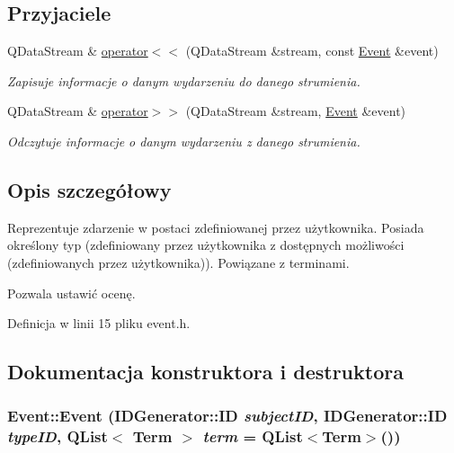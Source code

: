 \subsection*{Przyjaciele}
\begin{DoxyCompactItemize}
\item 
QDataStream \& \hyperlink{classEvent_a62e8730ab4dc16e3d456b527a12635b3}{operator$<$$<$} (QDataStream \&stream, const \hyperlink{classEvent}{Event} \&event)
\begin{DoxyCompactList}\small\item\em Zapisuje informacje o danym wydarzeniu do danego strumienia. \item\end{DoxyCompactList}\item 
QDataStream \& \hyperlink{classEvent_a055427e98ad131966edb6fb652add004}{operator$>$$>$} (QDataStream \&stream, \hyperlink{classEvent}{Event} \&event)
\begin{DoxyCompactList}\small\item\em Odczytuje informacje o danym wydarzeniu z danego strumienia. \item\end{DoxyCompactList}\end{DoxyCompactItemize}


\subsection{Opis szczegółowy}
Reprezentuje zdarzenie w postaci zdefiniowanej przez użytkownika. Posiada określony typ (zdefiniowany przez użytkownika z dostępnych możliwości (zdefiniowanych przez użytkownika)). Powiązane z terminami.

Pozwala ustawić ocenę. 

Definicja w linii 15 pliku event.h.



\subsection{Dokumentacja konstruktora i destruktora}
\hypertarget{classEvent_acd3992dc833e31573a209ba44910b57f}{
\subsubsection[{Event}]{\setlength{\rightskip}{0pt plus 5cm}Event::Event ({\bf IDGenerator::ID} {\em subjectID}, \/  {\bf IDGenerator::ID} {\em typeID}, \/  QList$<$ {\bf Term} $>$ {\em term} = {\ttfamily QList$<${\bf Term}$>$()})}}
\label{classEvent_acd3992dc833e31573a209ba44910b57f}


